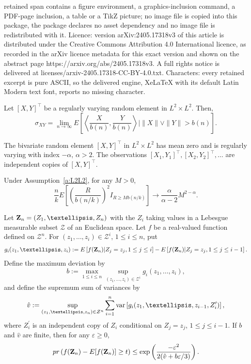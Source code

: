 \documentclass[10pt,a4paper]{amsart}
\newcommand \ag{\alpha}
\newcommand \eg{\varepsilon}
\newcommand \sg{\sigma}
\newcommand\bZ{{\bf Z}}
\newcommand\cZ{{\mathcal Z}}
\newcommand\lb{\left [}
\newcommand\lip{\left \langle}
\newcommand\lp{\left (}
\newcommand\rb{\right ]}
\newcommand\rip{\right \rangle}
\newcommand\rp{\right )}
\newcommand\var{\hbox{\rm var}}
\begin{document}
retained span contains a figure environment, a graphics-inclusion command, a PDF-page inclusion, a table or a TikZ picture; no image file is copied into this package, the package declares no asset dependency and no image file is redistributed with it. Licence: version arXiv:2405.17318v3 of this article is distributed under the Creative Commons Attribution 4.0 International licence, as recorded in the arXiv licence metadata for this exact version and shown on the abstract page https://arxiv.org/abs/2405.17318v3. A full rights notice is delivered at licenses/arxiv-2405.17318-CC-BY-4.0.txt. Characters: every retained excerpt is pure ASCII, so the delivered engine, XeLaTeX with its default Latin Modern text font, reports no missing character.
\begin{proposition} \label{p:sglim}
Let $[X,Y]^{\top}$ be a regularly varying random element in $L^2 \times L^2$. Then,
\[
\sg_{XY} = \lim_{n\to \infty}E\lb \lip \frac{X}{b(n)}, \frac{Y}{b(n)} \rip \Bigg|\|X\| \vee \|Y\| >b(n)\rb.
\]
\end{proposition}

\begin{assumption} \label{a:L2L2}
The bivariate random element $[X,Y]^{\top}$ in  $L^2 \times L^2$ has mean zero and is regularly varying with index $-\ag$, $\ag >2$. The observations $[X_1,Y_1]^{\top}, [X_2,Y_2]^{\top}, \ldots$ are independent copies of $[X,Y]^{\top}$.
\end{assumption}

\begin{lemma} \label{l:alM}
Under Assumption~\ref{a:L2L2}, for any $M>0$,
\[
\frac{n}{k} E \lb \lp \frac{R}{b(n/k)} \rp^2 I_{R \ge Mb(n/k) }  \rb  \to \frac{\ag}{\ag-2}M^{2-\ag}.
\]
\end{lemma}

\begin{lemma} \label{l:Bern}
Let $\bZ_n=(Z_1, \ldots, Z_n)$ with the $Z_i$ taking values in a
Lebesgue measurable subset $\cZ$ of an Euclidean space. Let $f$ be a real-valued function defined on $\cZ^n$. For $(z_1, \ldots, z_i) \in \cZ^{i}$, $1 \le i \le n$, put
\begin{equation} \label{eq:gi}
g_i(z_1, \ldots, z_i):=E\lb f(\bZ_n)| Z_j=z_j, 1 \le j \le i\rb -E\lb f(\bZ_n)| Z_j=z_j, 1 \le j \le i-1\rb.
\end{equation}
Define the maximum deviation by
\begin{equation} \label{eq:b}
b := \max_{1\le i\le n}\sup_{(z_1, \ldots, z_i) \in \cZ^i} g_i(z_1, \ldots, z_i),
\end{equation}
and define the supremum sum of variances by
\begin{equation} \label{eq:v}
\hat{v} := \sup_{(z_1, \ldots, z_n) \in \cZ^n} \sum_{i=1}^n \var\lb g_i(z_1, \ldots, z_{i-1}, Z_i^{\prime})\rb,
\end{equation}
where $Z_i^{\prime}$ is an independent copy of $Z_i$ conditional on $Z_j=z_j$, $1 \le j \le i-1$. If $b$ and $\hat{v}$ are finite, then for any $\eg \ge 0$,
\[
{\rm pr} \lp f(\bZ_n) - E[f(\bZ_n)] \ge t \rp \le \exp \lp \frac{-\eg^2}{2(\hat{v}+b\eg/3)}  \rp.
\]
\end{lemma}
\end{document}
